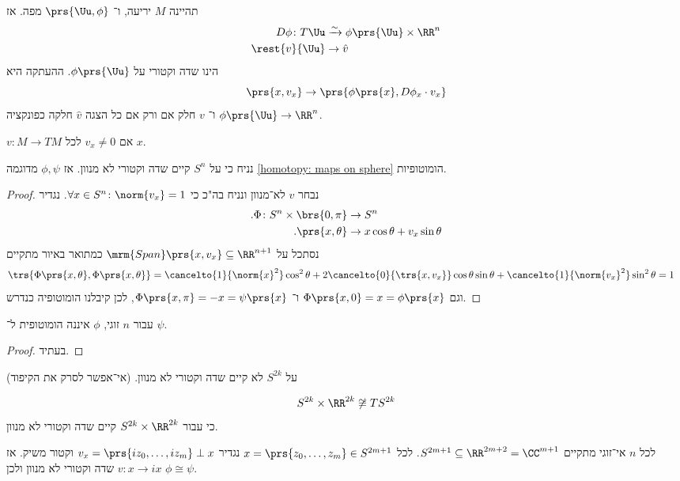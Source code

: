 \documentclass[a4paper,10pt,twoside,openany]{book}
\begin{document}
תהיינה
$M$
יריעה, ו־%
$\prs{\Uu,\phi}$
מפה.
אז
\begin{align*}
D\phi \colon T\Uu &\xrightarrow{\sim} \phi\prs{\Uu}\times \RR^n \\
\rest{v}{\Uu} &\to \hat{v}
\end{align*}
הינו שדה וקטורי על
$\phi\prs{\Uu}$.
ההעתקה היא
\[\prs{x,v_x} \to \prs{\phi\prs{x},D\phi_x \cdot v_x}\]
ו־%
$v$
חלק אם ורק אם כל הצגה
$\hat{v}$
חלקה כפונקציה
$\phi\prs{\Uu} \to \RR^n$.

\begin{definition}
$v \colon M \to TM$
אם
$v_x \neq 0$
לכל
$x$.
\end{definition}
\begin{proposition}
נניח כי על
$S^n$
קיים שדה וקטורי לא מנוון. אז
$\phi, \psi$
מדוגמה
\ref{homotopy: maps on sphere}
הומוטופיות.
\end{proposition}
\begin{proof}
נבחר
$v$
לא־מנוון ונניח בה"כ כי
$\forall x \in S^n \colon \norm{v_x} = 1$.
נגדיר
\begin{align*}
\text{.}\Phi \colon S^n \times \brs{0,\pi} &\to S^n \\ \text{.}\prs{x,\theta} &\to x\cos\theta + v_x\sin\theta
\end{align*}
נסתכל על
$\mrm{Span}\prs{x,v_x} \subseteq \RR^{n+1}$
כמתואר באיור
מתקיים
\begin{align*}
\trs{\Phi\prs{x,\theta},\Phi\prs{x,\theta}} &= \cancelto{1}{\norm{x}^2} \cos^2\theta + 2\cancelto{0}{\trs{x,v_x}}\cos\theta\sin\theta + \cancelto{1}{\norm{v_x}^2}\sin^2\theta = 1
\end{align*}
וגם
$\Phi\prs{x,0} = x = \phi\prs{x}$
ו־%
$\Phi\prs{x,\pi} = -x = \psi\prs{x}$,
לכן קיבלנו הומוטופיה כנדרש.
\end{proof}
\begin{theorem}
עבור
$n$
זוגי,
$\phi$
איננה הומוטופית ל־%
$\psi$.
\end{theorem}
\begin{proof}
\renewcommand{\blacksquare}{}
בעתיד.
\end{proof}
\begin{corollary}
על
$S^{2k}$
לא קיים שדה וקטורי לא מנוון. (אי־אפשר לסרק את הקיפוד)
\end{corollary}
\begin{corollary}
\[S^{2k} \times \RR^{2k} \not\cong TS^{2k}\]
כי עבור
$S^{2k} \times \RR^{2k}$
קיים שדה וקטורי לא מנוון.
\end{corollary}
\begin{example}
לכל
$n$
אי־זוגי מתקיים
$S^{2m+1} \subseteq \RR^{2m + 2} = \CC^{m+1}$.
לכל
$x = \prs{z_0, \ldots, z_m} \in S^{2m + 1}$
נגדיר
$v_x = \prs{iz_0, \ldots, iz_m} \perp x$
וקטור משיק. אז
$v \colon x \to ix$
שדה וקטורי לא מנוון ולכן
$\phi \cong \psi$.
\end{example}
\end{document}
